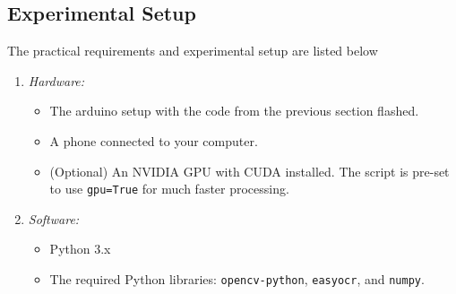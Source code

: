 \documentclass[conference]{IEEEtran}
\begin{document}
\subsection{Experimental Setup}
The practical requirements and experimental setup are listed below
\begin{enumerate}
	\item {\em Hardware:}
\begin{itemize}
    \item The arduino setup with the code from the previous section flashed.
    \item A phone connected to your computer.
    \item {(Optional)} An NVIDIA GPU with CUDA installed. The script is pre-set to use \texttt{gpu=True} for much faster processing.
\end{itemize}
%
\item {\em Software:}
\begin{itemize}
    \item Python 3.x
    \item The required Python libraries: \texttt{opencv-python}, \texttt{easyocr}, and \texttt{numpy}.
\end{itemize}
\end{enumerate}
\end{document}
